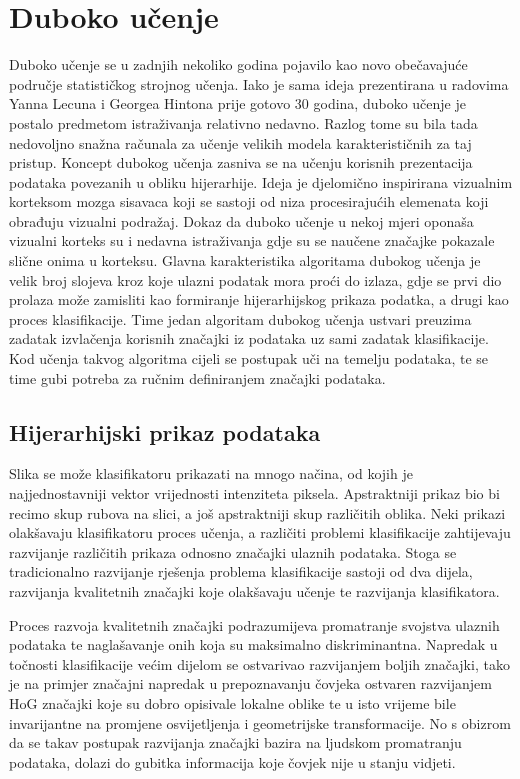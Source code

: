 \documentclass[lmodern, utf8, diplomski, numeric]{fer}
\begin{document}
\chapter{Duboko učenje}

Duboko učenje se u zadnjih nekoliko godina pojavilo kao novo obečavajuće područje statističkog strojnog učenja. Iako je sama ideja prezentirana u radovima Yanna Lecuna i Georgea Hintona prije gotovo 30 godina, duboko učenje je postalo predmetom istraživanja relativno nedavno. Razlog tome su bila tada nedovoljno snažna računala za učenje velikih modela karakterističnih za taj pristup. Koncept dubokog učenja zasniva se na učenju korisnih prezentacija podataka povezanih u obliku hijerarhije. Ideja je djelomično inspirirana vizualnim korteksom mozga sisavaca koji se sastoji od niza procesirajućih elemenata koji obrađuju vizualni podražaj. Dokaz da duboko učenje u nekoj mjeri oponaša vizualni korteks su i nedavna istraživanja gdje su se naučene značajke pokazale slične onima u korteksu. Glavna karakteristika algoritama dubokog učenja je velik broj slojeva kroz koje ulazni podatak mora proći do izlaza, gdje se prvi dio prolaza može zamisliti kao formiranje hijerarhijskog prikaza podatka, a drugi kao proces klasifikacije. Time jedan algoritam dubokog učenja ustvari preuzima zadatak izvlačenja korisnih značajki iz podataka uz sami zadatak klasifikacije. Kod učenja takvog algoritma cijeli se postupak uči na temelju podataka, te se time gubi potreba za ručnim definiranjem značajki podataka. 

\section{Hijerarhijski prikaz podataka}

Slika se može klasifikatoru prikazati na mnogo načina, od kojih je najjednostavniji vektor vrijednosti intenziteta piksela. Apstraktniji prikaz bio bi recimo skup rubova na slici, a još apstraktniji skup različitih oblika. Neki prikazi olakšavaju klasifikatoru proces učenja, a različiti problemi klasifikacije zahtijevaju razvijanje različitih prikaza odnosno značajki ulaznih podataka. Stoga  se tradicionalno razvijanje rješenja problema klasifikacije sastoji od dva dijela, razvijanja kvalitetnih značajki koje olakšavaju učenje te razvijanja klasifikatora. 

Proces razvoja kvalitetnih značajki podrazumijeva promatranje svojstva ulaznih podataka te naglašavanje onih koja su maksimalno diskriminantna. Napredak u točnosti klasifikacije većim dijelom se ostvarivao razvijanjem boljih značajki, tako je na primjer značajni napredak u prepoznavanju čovjeka ostvaren razvijanjem HoG značajki koje su dobro opisivale lokalne oblike te u isto vrijeme bile invarijantne na  promjene osvijetljenja i geometrijske transformacije. No s obizrom da se takav postupak razvijanja značajki bazira na ljudskom promatranju podataka, dolazi do gubitka informacija koje čovjek nije u stanju vidjeti. 
\end{document}
